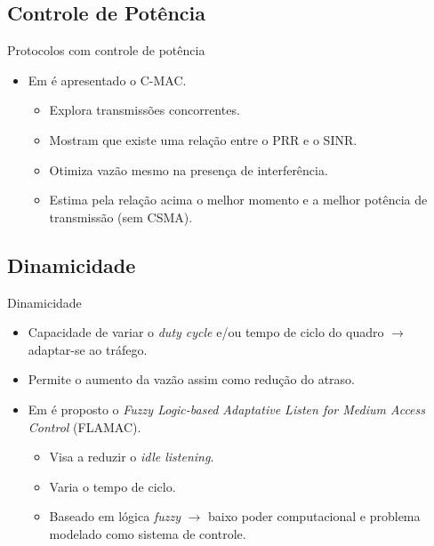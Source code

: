 \documentclass{beamer}
\begin{document}
\subsection{Controle de Potência}
\begin{frame}{Protocolos com controle de potência}
  \begin{itemize}
    \item Em \cite{20094212373426} é apresentado o C-MAC.
    \begin{itemize}
      \item Explora transmissões concorrentes.
      \item Mostram que existe uma relação entre o PRR e o SINR.
      \item Otimiza vazão mesmo na presença de interferência.
      \item Estima pela relação acima o melhor momento e a melhor potência de transmissão (sem CSMA).
    \end{itemize}
  \end{itemize}
\end{frame}

\subsection{Dinamicidade}
\begin{frame}{Dinamicidade}
  \begin{itemize}
    \item Capacidade de variar o \emph{duty cycle} e/ou tempo de ciclo do quadro $\rightarrow$ adaptar-se ao tráfego.
    \item Permite o aumento da vazão assim como redução do atraso.
    \item Em \cite{20100812725891} é proposto o \emph{Fuzzy Logic-based Adaptative Listen for Medium Access Control} (FLAMAC).
    \begin{itemize}
      \item Visa a reduzir o \emph{idle listening}.
      \item Varia o tempo de ciclo.
      \item Baseado em lógica \emph{fuzzy} $\rightarrow$ baixo poder computacional e problema modelado como sistema de controle.
    \end{itemize}
  \end{itemize}
\end{frame}
\end{document}
